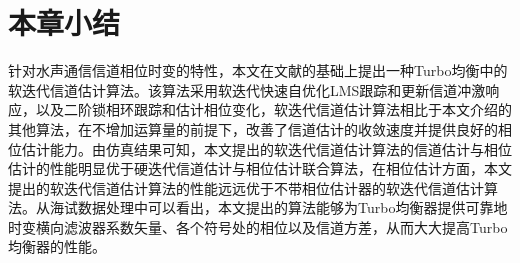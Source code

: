 \section{本章小结}
针对水声通信信道相位时变的特性，本文在文献的基础上提出一种Turbo均衡中的软迭代信道估计算法。该算法采用软迭代快速自优化LMS跟踪和更新信道冲激响应，以及二阶锁相环跟踪和估计相位变化，软迭代信道估计算法相比于本文介绍的其他算法，在不增加运算量的前提下，改善了信道估计的收敛速度并提供良好的相位估计能力。由仿真结果可知，本文提出的软迭代信道估计算法的信道估计与相位估计的性能明显优于硬迭代信道估计与相位估计联合算法，在相位估计方面，本文提出的软迭代信道估计算法的性能远远优于不带相位估计器的软迭代信道估计算法。从海试数据处理中可以看出，本文提出的算法能够为Turbo均衡器提供可靠地时变横向滤波器系数矢量、各个符号处的相位以及信道方差，从而大大提高Turbo均衡器的性能。
%
\clearpage{\pagestyle{empty}\cleardoublepage}